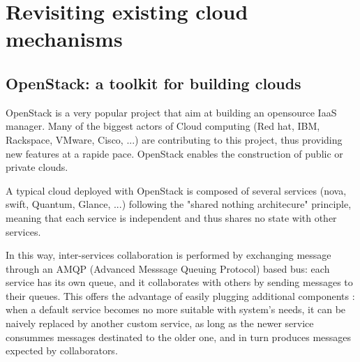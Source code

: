\section{Revisiting existing cloud mechanisms}
\label{sec:integration}

\subsection{OpenStack: a toolkit for building clouds}

	





OpenStack is a very popular project that aim at building an opensource IaaS
manager. Many of the biggest actors of Cloud computing (Red hat, IBM, Rackspace,
VMware, Cisco, ...) are contributing to this project, thus providing new 
features at a rapide pace. OpenStack enables the construction of public or 
private clouds.

A typical cloud deployed with OpenStack is composed of several services (nova, 
swift, Quantum, Glance, ...) following the "shared nothing architecure" 
principle, meaning that each service is independent and thus shares no state 
with other services.

In this way, inter-services collaboration is performed by exchanging message 
through an AMQP (Advanced Messsage Queuing Protocol) based bus: each service 
has its own queue, and it collaborates with others by sending messages to their 
queues. This offers the advantage of easily plugging additional components : 
when a default service becomes no more suitable with system's needs, it can be 
naively replaced by another custom service, as long as the newer service 
consummes messages destinated to the older one, and in turn produces messages 
expected by collaborators.

